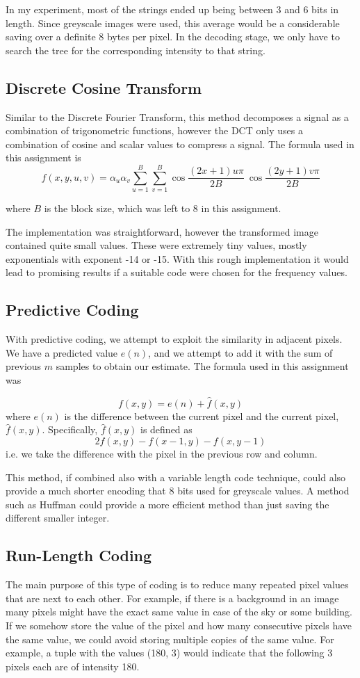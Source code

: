 \documentclass{article}
\begin{document}
In my experiment, most of the strings ended up being between 3 and 6 bits in length. Since greyscale
images were used, this average would be a considerable saving over a definite 8 bytes per pixel.
In the decoding stage, we only have to search the tree for the corresponding intensity to that
string. 
\subsection{Discrete Cosine Transform}
Similar to the Discrete Fourier Transform, this method decomposes a signal as a combination
of trigonometric functions, however the DCT only uses a combination of cosine and scalar
values to compress a signal. The formula used in this assignment is 
\[f(x, y, u, v) = \alpha_{u}\alpha_{v}\sum_{u=1}^{B}\sum_{v=1}^{B}\cos{\frac{(2x+1)u\pi}{2B}} \
\cos{\frac{(2y+1)v\pi}{2B}}\]

where $B$ is the block size, which was left to 8 in this assignment.

The implementation was straightforward, however the transformed image contained quite 
small values. These were extremely tiny values, mostly exponentials with exponent -14
or -15. With this rough implementation it would lead to promising results if a suitable
code were chosen for the frequency values.

\subsection{Predictive Coding}
With predictive coding, we attempt to exploit the similarity in adjacent pixels. We have a
predicted value $e(n)$, and we attempt to add it with the sum of previous $m$ samples to 
obtain our estimate. The formula used in this assignment was 

\[f(x, y) = e(n) + \hat{f}(x, y)\]
where $e(n)$ is the difference between the current pixel and the current pixel, $\hat{f}(x, y)$.
Specifically, $\hat{f}(x, y)$ is defined as 
\[2f(x, y) - f(x-1, y) - f(x, y-1)\]
i.e. we take the difference with the pixel in the previous row and column.

This method, if combined also with a variable length code technique, could also provide a much shorter
encoding that 8 bits used for greyscale values. A method such as Huffman could provide a more 
efficient method than just saving the different smaller integer.

\subsection{Run-Length Coding}
The main purpose of this type of coding is to reduce many repeated pixel values that are next to each other. 
For example, if there is a background in an image many pixels might have the exact same value in case of the 
sky or some building. If we somehow store the value of the pixel and how many consecutive pixels have the 
same value, we could avoid storing multiple copies of the same value. For example, a tuple with the 
values (180, 3) would indicate that the following 3 pixels each are of intensity 180.
\end{document}
